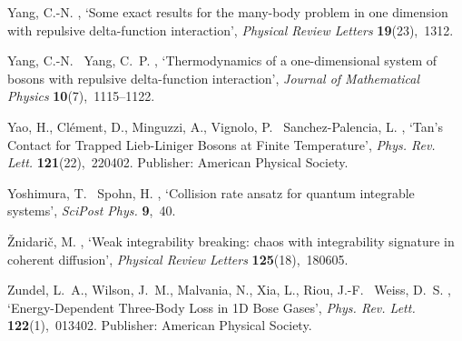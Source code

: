 \documentclass[onecolumn,amsfonts,showpacs,superscriptaddress]{revtex4-1}
\begin{document}
\begin{thebibliography}{xx}
Yang, C.-N.  \harvardyearright , `Some exact results for
  the many-body problem in one dimension with repulsive delta-function
  interaction', {\em Physical Review Letters} {\bf 19}(23),~1312.

Yang, C.-N. \harvardand\ Yang, C.~P.  \harvardyearright ,
  `Thermodynamics of a one-dimensional system of bosons with repulsive
  delta-function interaction', {\em Journal of Mathematical Physics} {\bf
  10}(7),~1115--1122.

Yao, H., Clément, D., Minguzzi, A., Vignolo, P. \harvardand\ Sanchez-Palencia,
  L.  \harvardyearleft 2018\harvardyearright , `Tan's {Contact} for {Trapped}
  {Lieb}-{Liniger} {Bosons} at {Finite} {Temperature}', {\em Phys. Rev. Lett.}
  {\bf 121}(22),~220402.
\newblock Publisher: American Physical Society.

Yoshimura, T. \harvardand\ Spohn, H.  \harvardyearleft 2020\harvardyearright ,
  `{Collision rate ansatz for quantum integrable systems}', {\em SciPost Phys.}
  {\bf 9},~40.

{\v{Z}}nidari{\v{c}}, M.  \harvardyearright , `Weak
  integrability breaking: chaos with integrability signature in coherent
  diffusion', {\em Physical Review Letters} {\bf 125}(18),~180605.

Zundel, L.~A., Wilson, J.~M., Malvania, N., Xia, L., Riou, J.-F. \harvardand\
  Weiss, D.~S.  \harvardyearright , `Energy-{Dependent}
  {Three}-{Body} {Loss} in {1D} {Bose} {Gases}', {\em Phys. Rev. Lett.} {\bf
  122}(1),~013402.
\newblock Publisher: American Physical Society.

\end{thebibliography}
\end{document}
